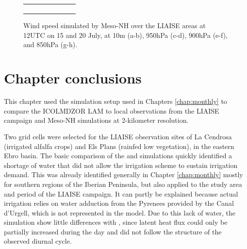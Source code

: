 \begin{figure}[hbtp]
\begin{tabular}{cc}
\begin{subfigure}[t]{0.5\textwidth}
        \end{subfigure} \\
    \end{tabular}
    \caption{Wind speed simulated by Meso-NH over the LIAISE areas at 12UTC on 15 and 20 July, at 10m (a-b), 950hPa (c-d), 900hPa (e-f), and 850hPa (g-h).}
    \label{fig:iop_days_winds}
\end{figure}

\clearpage

\section{Chapter conclusions}

This chapter used the simulation setup used in Chapters \ref{chap:monthly} to compare the ICOLMDZOR LAM to local observations from the LIAISE campaign and Meso-NH simulations at 2-kilometer resolution.

Two grid cells were selected for the LIAISE observation sites of La Cendrosa (irrigated alfalfa crops) and Els Plans (rainfed low vegetation), in the eastern Ebro basin.
The basic comparison of the \noirr and \irr simulations quickly identified a shortage of water that did not allow the irrigation scheme to sustain irrigation demand. This was already identified generally in Chapter \ref{chap:monthly} mostly for southern regions of the Iberian Peninsula, but also applied to the study area and period of the LIAISE campaign. It can partly be explained because actual irrigation relies on water adduction from the Pyrenees provided by the Canal d'Urgell, which is not represented in the model.
Due to this lack of water, the \irr simulation show little differences with \noirr, since latent heat flux could only be partially increased during the day and did not follow the structure of the observed diurnal cycle.

